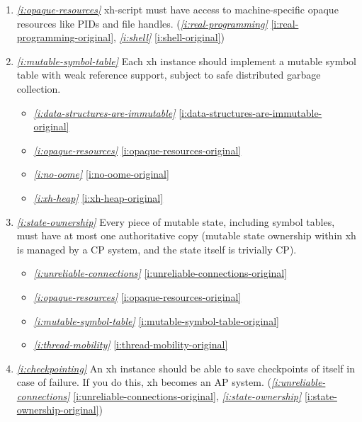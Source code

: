 \documentclass{report}
\makeatletter
\newcommand*{\Label}[2]{%
  \@bsphack
  \begingroup
    \label{#1-original}%
    \def\@currentlabel{#2}%
    \label{#1}%
  \endgroup
  \@esphack
}
\newcommand{\refboth}[1]{{\em \ref{#1}} \ref{#1-original}}
\makeatother
\begin{document}
\begin{enumerate}
\item{}\Label{i:opaque-resources}{opaques}{\em\ref{i:opaque-resources}}
  xh-script must have access to machine-specific opaque resources like PIDs
  and file handles.
(\refboth{i:real-programming}, \refboth{i:shell})
\item{}\Label{i:mutable-symbol-table}{mutablesyms}{\em\ref{i:mutable-symbol-table}}
  Each xh instance should implement a mutable symbol table with weak
  reference support, subject to safe distributed garbage collection.
\begin{itemize}
\item \refboth{i:data-structures-are-immutable}
\item \refboth{i:opaque-resources}
\item \refboth{i:no-oome}
\item \refboth{i:xh-heap}
\end{itemize}
\item{}\Label{i:state-ownership}{stateown}{\em\ref{i:state-ownership}}
  Every piece of mutable state, including symbol tables, must have at most
  one authoritative copy (mutable state ownership within xh is managed by a
  CP system, and the state itself is trivially CP).
\begin{itemize}
\item \refboth{i:unreliable-connections}
\item \refboth{i:opaque-resources}
\item \refboth{i:mutable-symbol-table}
\item \refboth{i:thread-mobility}
\end{itemize}
\item{}\Label{i:checkpointing}{checkpoint}{\em\ref{i:checkpointing}}
  An xh instance should be able to save checkpoints of itself in case of
  failure. If you do this, xh becomes an AP system.
(\refboth{i:unreliable-connections}, \refboth{i:state-ownership})


\end{enumerate}
\end{document}
